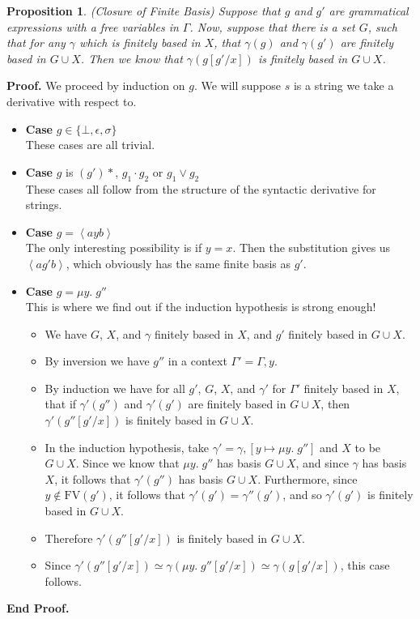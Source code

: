\documentclass{article}
\newcommand{\fix}[2]{\mu {#1}.\;{#2}}
\newcommand{\lft}[1]{\left<{#1}\right.}
\newcommand{\rgt}[1]{\left.{#1}\right>}
\newcommand{\setof}[1]{\{{#1}\}}
\newtheorem{prop}{Proposition}
\newenvironment{proof}{\noindent\textbf{Proof.}}
{\noindent\textbf{End Proof.}}
\newenvironment{caseblock}{\begin{itemize}}{\end{itemize}}
\newenvironment{case}[1]{\item \textbf{Case} {#1}\\}{}
\begin{document}
\begin{prop}{(Closure of Finite Basis)}
Suppose that $g$ and $g'$ are grammatical expressions with a free
variables in $\Gamma$. Now, suppose that there is a set $G$, such that
for any $\gamma$ which is finitely based in $X$, that $\gamma(g)$ and
$\gamma(g')$ are finitely based in $G \cup X$.  Then we know that
$\gamma(g[g'/x])$ is finitely based in $G \cup X$.
\end{prop}

\begin{proof}
We proceed by induction on $g$. We will suppose $s$ is a string we 
take a derivative with respect to. 
\begin{caseblock}
  \begin{case}{$g \in \setof{\bot, \epsilon, \sigma}$}
    These cases are all trivial. 
  \end{case}

  \begin{case}{$g$ is $(g')*$, $g_1\cdot g_2$ or $g_1 \vee g_2$}
    These cases all follow from the structure of the syntactic derivative
    for strings. 
  \end{case}

  \begin{case}{$g = \lft{a}y\rgt{b}$}
    The only interesting possibility is if $y = x$. Then the substitution 
    gives us $\lft{a}g'\rgt{b}$, which obviously has the same finite basis as $g'$. 
  \end{case}

  \begin{case}{$g = \fix{y}{g''}$}
    This is where we find out if the induction hypothesis is strong enough!
    \begin{itemize}
      \item We have $G$, $X$, and $\gamma$ finitely based in $X$, and $g'$ finitely
        based in $G \cup X$. 
      \item By inversion we have $g''$ in a context $\Gamma' = \Gamma, y$. 
      \item By induction we have for all $g'$, $G$, $X$, and $\gamma'$ for $\Gamma'$ finitely
        based in $X$, that if $\gamma'(g'')$ and $\gamma'(g')$ are finitely based in $G \cup X$,
        then $\gamma'(g''[g'/x])$ is finitely based in $G \cup X$. 
      \item In the induction hypothesis, take $\gamma' = \gamma, [y \mapsto \fix{y}{g''}]$ and 
        $X$ to be $G \cup X$. Since we know that $\fix{y}{g''}$ has basis $G \cup X$, and since
        $\gamma$ has basis $X$, it follows that $\gamma'(g'')$ has basis $G \cup X$. Furthermore, 
        since $y \not\in \mathrm{FV}(g')$, it follows that $\gamma'(g') = \gamma''(g')$, and 
        so $\gamma'(g')$ is finitely based in $G \cup X$. 
      \item Therefore $\gamma'(g''[g'/x])$ is finitely based in $G \cup X$. 
      \item Since $\gamma'(g''[g'/x]) \simeq\gamma(\fix{y}{g''[g'/x]}) \simeq \gamma(g[g'/x])$, 
        this case follows.         
    \end{itemize}
  \end{case}
\end{caseblock}
\end{proof}
\end{document}
